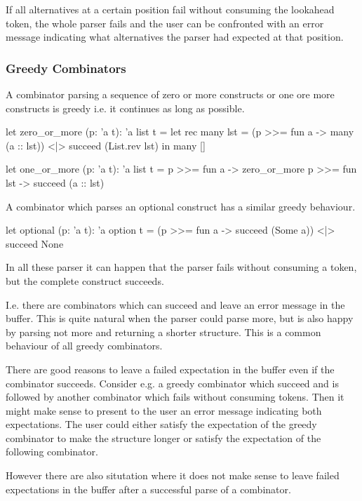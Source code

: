 If all alternatives at a certain position fail without consuming the lookahead
token, the whole parser fails and the user can be confronted with an error
message indicating what alternatives the parser had expected at that position.


\subsubsection{Greedy Combinators}

A combinator parsing a sequence of zero or more constructs or one ore more
constructs is greedy i.e. it continues as long as possible.

\begin{ocaml}
  let zero_or_more (p: 'a t): 'a list t =
     let rec many lst =
       (p >>= fun a -> many (a :: lst))
       <|> succeed (List.rev lst)
     in
     many []

  let one_or_more (p: 'a t): 'a list t =
     p >>= fun a ->
     zero_or_more p >>= fun lst ->
     succeed (a :: lst)
\end{ocaml}


A combinator which parses an optional construct has a similar greedy
behaviour.
\begin{ocaml}
  let optional (p: 'a t): 'a option t =
    (p >>= fun a -> succeed (Some a))
    <|> succeed None
\end{ocaml}

In all these parser it can happen that the parser  fails without
consuming a token, but the complete construct succeeds.

I.e. there are combinators which can succeed and leave an error message in the
buffer. This is quite natural when the parser could parse more, but is also
happy by parsing not more and returning a shorter structure. This is a common
behaviour of all greedy combinators.


There are good reasons to leave a failed expectation in the buffer even if the
combinator succeeds. Consider e.g. a greedy combinator which succeed and is
followed by another combinator which fails without consuming tokens. Then it
might make sense to present to the user an error message indicating both
expectations. The user could either satisfy the expectation of the greedy
combinator to make the structure longer or satisfy the expectation of the
following combinator.

However there are also situtation where it does not make sense to leave failed
expectations in the buffer after a successful parse of a combinator.

